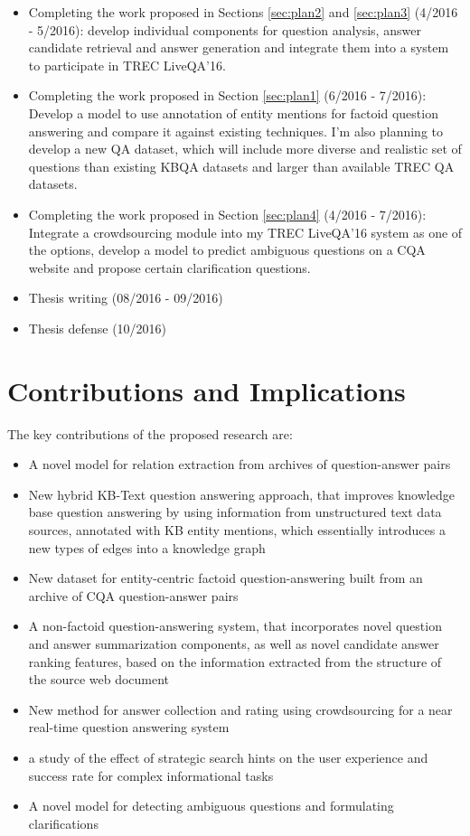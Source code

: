 \begin{itemize}
\item Completing the work proposed in Sections \ref{sec:plan2} and \ref{sec:plan3} (4/2016 - 5/2016): develop individual components for question analysis, answer candidate retrieval and answer generation and integrate them into a system to participate in TREC LiveQA'16.
\item Completing the work proposed in Section \ref{sec:plan1} (6/2016 - 7/2016): Develop a model to use annotation of entity mentions for factoid question answering and compare it against existing techniques. I'm also planning to develop a new QA dataset, which will include more diverse and realistic set of questions than existing KBQA datasets and larger than available TREC QA datasets.
\item Completing the work proposed in Section \ref{sec:plan4} (4/2016 - 7/2016): Integrate a crowdsourcing module into my TREC LiveQA'16 system as one of the options, develop a model to predict ambiguous questions on a CQA website and propose certain clarification questions.
\item Thesis writing (08/2016 - 09/2016) 
\item Thesis defense (10/2016)
\end{itemize}


\section{Contributions and Implications}

The key contributions of the proposed research are:


\begin{itemize}
\item A novel model for relation extraction from archives of question-answer pairs
\item New hybrid KB-Text question answering approach, that improves knowledge base question answering by using information from unstructured text data sources, annotated with KB entity mentions, which essentially introduces a new types of edges into a knowledge graph
\item New dataset for entity-centric factoid question-answering built from an archive of CQA question-answer pairs
\item A non-factoid question-answering system, that incorporates novel question and answer summarization components, as well as novel candidate answer ranking features, based on the information extracted from the structure of the source web document
\item New method for answer collection and rating using crowdsourcing for a near real-time question answering system
\item a study of the effect of strategic search hints on the user experience and success rate for complex informational tasks
\item A novel model for detecting ambiguous questions and formulating clarifications
\end{itemize}
